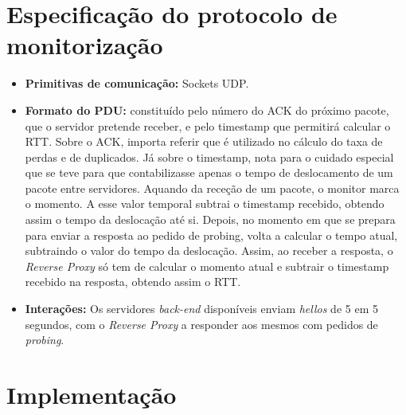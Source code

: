 \documentclass{llncs}
\begin{document}
\newpage

\section{Especificação do protocolo de monitorização}

\begin{itemize}
	\setlength\itemsep{1em}
\item \textbf{Primitivas de comunicação:} Sockets UDP.
\item \textbf{Formato do PDU:} constituído pelo número do ACK do próximo pacote, que o servidor pretende receber, e pelo timestamp que permitirá calcular o RTT. Sobre o ACK, importa referir que é utilizado no cálculo do taxa de perdas e de duplicados. Já sobre o timestamp, nota para o cuidado especial que se teve para que contabilizasse apenas o tempo de deslocamento de um pacote entre servidores. Aquando da receção de um pacote, o monitor marca o momento. A esse valor temporal subtrai o timestamp recebido, obtendo assim o tempo da deslocação até si. Depois, no momento em que se prepara para enviar a resposta ao pedido de probing, volta a calcular o tempo atual, subtraindo o valor do tempo da deslocação. Assim, ao receber a resposta, o \textit{Reverse Proxy} só tem de calcular o momento atual e subtrair o timestamp recebido na resposta, obtendo assim o RTT.
\item \textbf{Interações:} Os servidores \textit{back-end} disponíveis enviam \textit{hellos} de 5 em 5 segundos, com o \textit{Reverse Proxy} a responder aos mesmos com pedidos de \textit{probing}.
\end{itemize}

\newpage

\section{Implementação}
\end{document}

